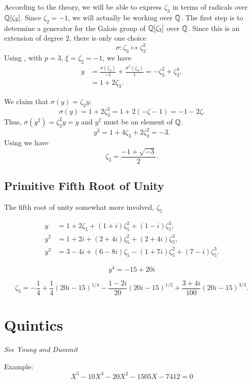 According to the theory, we will be able to express $\zeta_3$ in terms
of radicals over $\mathbb{Q}[\zeta_2]$.  Since $\zeta_2 = -1$, we will
actually be working over $\mathbb{Q}$.  The first step is to determine a
generator for the Galois group of $\mathbb{Q}[\zeta_3]$ over $\mathbb{Q}$.  Since this
is an extension of degree $2$, there is only one choice
\[
\sigma : \zeta_3 \mapsto \zeta_3^2.
\]
Using , with $p = 3$, $\xi = \zeta_2 = -1$, we have
\begin{equation}\label{Zeta3:Eq}
\begin{aligned}
  y &= \frac{\sigma(\zeta_3)}{-1} + \frac{\sigma^2(\zeta_3)}{1} 
    = -\zeta_3^2 + \zeta_3^4, \\
    & = 1 + 2\zeta_3.
\end{aligned}
\end{equation}

We claim that $\sigma(y) = \zeta_2 y$:
\[
\sigma(y) = 1 + 2\zeta_3^2 = 1 + 2(- \zeta -1) = -1 - 2\zeta.
\]
Thus, $\sigma(y^2) = \zeta_2^2 y = y$ and $y^2$ must be an element of
$\mathbb{Q}$.
\[
y^2 = 1 + 4 \zeta_3 + 2\zeta_3^2 = -3.
\]
Using  we have
\[
\zeta_3 = \frac{-1 + \sqrt{-3}}{2}.
\]

\subsection{Primitive Fifth Root of Unity}
The fifth root of unity somewhat more involved, $\zeta_5$

\[
\begin{aligned}
y &= 1 + 2 \zeta_5 + (1+ i) \zeta_5^2 + (1 - i) \zeta_5^3, \\
y^2 &= 1 + 2i + (2+4i) \zeta_5^2 + (2 + 4i) \zeta_5^3, \\
y^3 & = 3-4i + (6-8i)\zeta_5 - (1 + 7i) \zeta_5^2 + (7 - i)\zeta_5^3.
\end{aligned}
\]

\[
y^4 = -15 + 20 i
\]

\[
\zeta_5 = -\frac{1}{4} + \frac{1}{4} \left(20 i -15\right)^{1/4}
 - \frac{1-2i}{20} \left(20 i -15\right)^{1/2}
 + \frac{3+4i}{100} \left(20 i -15\right)^{3/4}.
\]

\section{Quintics}
{\em See Young \cite{Young88} and Dummit \cite{Dummit91}}

Example:
\[
X^5 - 10 X^3 - 20X^2 - 1505 X - 7412 = 0
\]

